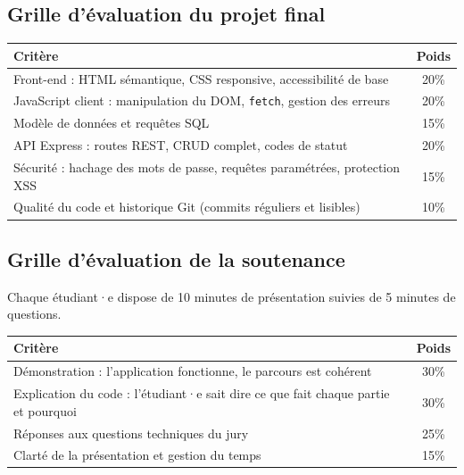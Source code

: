 \documentclass[a4paper,11pt]{article}
\begin{document}
\medskip
{}

\subsection{Grille d'évaluation du projet final}

\begin{center}
\begin{tabularx}{\linewidth}{Xc}
  \toprule
  \rowcolor{accentBlue}
  \color{white}\textbf{Critère} &
  \color{white}\textbf{Poids} \\
  \midrule
  \rowcolor{cfptGrey}
  Front-end : HTML sémantique, CSS responsive, accessibilité de base & 20\% \\
  JavaScript client : manipulation du DOM, \texttt{fetch}, gestion des erreurs & 20\% \\
  \rowcolor{cfptGrey}
  Modèle de données et requêtes SQL & 15\% \\
  API Express : routes REST, CRUD complet, codes de statut & 20\% \\
  \rowcolor{cfptGrey}
  Sécurité : hachage des mots de passe, requêtes paramétrées, protection XSS & 15\% \\
  Qualité du code et historique Git (commits réguliers et lisibles) & 10\% \\
  \bottomrule
\end{tabularx}
\end{center}

\subsection{Grille d'évaluation de la soutenance}

Chaque étudiant·e dispose de 10 minutes de présentation suivies de 5 minutes de questions.

\begin{center}
\begin{tabularx}{\linewidth}{Xc}
  \toprule
  \rowcolor{accentBlue}
  \color{white}\textbf{Critère} &
  \color{white}\textbf{Poids} \\
  \midrule
  \rowcolor{cfptGrey}
  Démonstration : l'application fonctionne, le parcours est cohérent & 30\% \\
  Explication du code : l'étudiant·e sait dire ce que fait chaque partie et pourquoi & 30\% \\
  \rowcolor{cfptGrey}
  Réponses aux questions techniques du jury & 25\% \\
  Clarté de la présentation et gestion du temps & 15\% \\
  \bottomrule
\end{tabularx}
\end{center}
\end{document}
